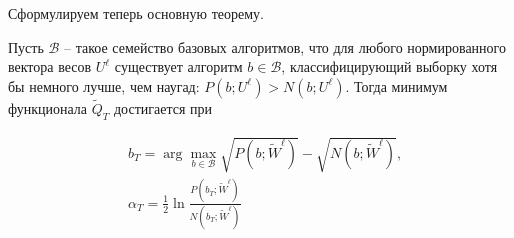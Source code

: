     Сформулируем теперь основную теорему.
    \begin{theorem}
    	Пусть $\mathscr{B}$ -- такое семейство базовых алгоритмов, что для любого нормированного вектора весов $U^{\ell}$ существует алгоритм $b \in \mathscr{B}$, классифицирующий выборку хотя бы немного лучше, чем наугад: $P\left(b ; U^{\ell}\right)>N\left(b ; U^{\ell}\right)$.
    	Тогда минимум функционала $\widetilde{Q}_T$ достигается при
    	
    	\begin{equation*}
    		\begin{aligned}
    			& b_T=\arg \max _{b \in \mathscr{B}} \sqrt{P\left(b ; \widetilde{W}^{\ell}\right)}-\sqrt{N\left(b ; \widetilde{W}^{\ell}\right)}, \\
    			& \alpha_T=\frac{1}{2} \ln \frac{P\left(b_T ; \widetilde{W}^{\ell}\right)}{N\left(b_T ; \widetilde{W}^{\ell}\right)}
    		\end{aligned}
    	\end{equation*}
    \end{theorem}
    
